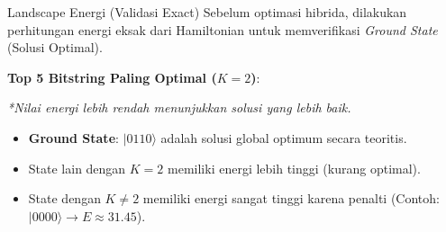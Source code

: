 \documentclass{beamer}
\begin{document}
\begin{frame}{Landscape Energi (Validasi Exact)}
    Sebelum optimasi hibrida, dilakukan perhitungan energi eksak dari Hamiltonian untuk memverifikasi \textit{Ground State} (Solusi Optimal). 
    
    \textbf{Top 5 Bitstring Paling Optimal ($K=2$)}:
    \begin{table}[]
        \centering
        \par\medskip
        \footnotesize \textit{*Nilai energi lebih rendah menunjukkan solusi yang lebih baik.}
    \end{table}
    
    \begin{itemize}
        \item \textbf{Ground State}: $|0110\rangle$ adalah solusi global optimum secara teoritis.
        \item State lain dengan $K=2$ memiliki energi lebih tinggi (kurang optimal).
        \item State dengan $K \neq 2$ memiliki energi sangat tinggi karena penalti (Contoh: $|0000\rangle \rightarrow E \approx 31.45$).
    \end{itemize}
\end{frame}
\end{document}
